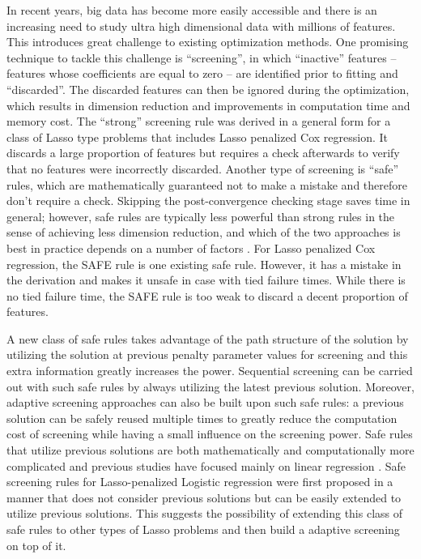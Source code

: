 In recent years, big data has become more easily accessible and there is an increasing need to study ultra high dimensional data with millions of features. This introduces great challenge to existing optimization methods. One promising technique to tackle this challenge is ``screening'', in which ``inactive'' features -- features whose coefficients are equal to zero -- are identified prior to fitting and ``discarded''. The discarded features can then be ignored during the optimization, which results in dimension reduction and improvements in computation time and memory cost. The ``strong'' screening rule \citep{Tibshirani2012} was derived in a general form for a class of Lasso type problems that includes Lasso penalized Cox regression. It discards a large proportion of features but requires a check afterwards to verify that no features were incorrectly discarded. Another type of screening is ``safe'' rules, which are mathematically guaranteed not to make a mistake and therefore don't require a check. Skipping the post-convergence checking stage saves time in general; however, safe rules are typically less powerful than strong rules in the sense of achieving less dimension reduction, and which of the two approaches is best in practice depends on a number of factors . For Lasso penalized Cox regression, the SAFE rule \citep{ko2017solving} is one existing safe rule. However, it has a mistake in the derivation and makes it unsafe in case with tied failure times. While there is no tied failure time, the SAFE rule is too weak to discard a decent proportion of features.

A new class of safe rules takes advantage of the path structure of the solution by utilizing the solution at previous penalty parameter values for screening and this extra information greatly increases the power. Sequential screening can be carried out with such safe rules by always utilizing the latest previous solution. Moreover, adaptive screening approaches \citep{wang2021adaptive} can also be built upon such safe rules: a previous solution can be safely reused multiple times to greatly reduce the computation cost of screening while having a small influence on the screening power. Safe rules that utilize previous solutions are both mathematically and computationally more complicated and previous studies have focused mainly on linear regression \citep{wang2013lasso}. Safe screening rules for Lasso-penalized Logistic regression \citep{wang2014safe} were first proposed in a manner that does not consider previous solutions but can be easily extended to utilize previous solutions. This suggests the possibility of extending this class of safe rules to other types of Lasso problems and then build a adaptive screening on top of it.

